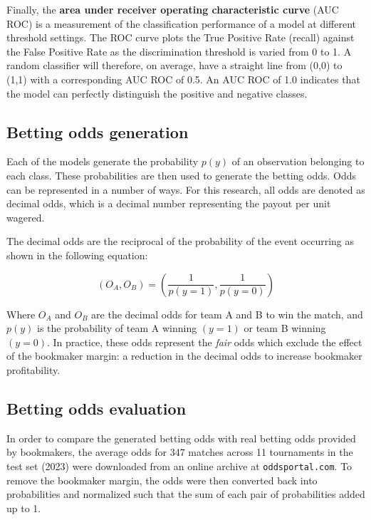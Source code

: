 Finally, the \textbf{area under receiver operating characteristic curve} (AUC ROC) is a measurement of the classification performance of a model at different threshold settings. The ROC curve plots the True Positive Rate (recall) against the False Positive Rate as the discrimination threshold is varied from 0 to 1. A random classifier will therefore, on average, have a straight line from (0,0) to (1,1) with a corresponding AUC ROC of 0.5. An AUC ROC of 1.0 indicates that the model can perfectly distinguish the positive and negative classes.

\subsection{Betting odds generation}

Each of the models generate the probability $p(y)$ of an observation belonging to each class. These probabilities are then used to generate the betting odds. Odds can be represented in a number of ways. For this research, all odds are denoted as decimal odds, which is a decimal number representing the payout per unit wagered. 

The decimal odds are the reciprocal of the probability of the event occurring as shown in the following equation:

\[ \left( O_A, O_B \right)  = \left( \frac{1}{p(y=1)}, \frac{1}{p(y=0)} \right) \]

Where $O_A$ and $O_B$ are the decimal odds for team A and B to win the match, and $p(y)$ is the probability of team A winning $(y=1)$ or team B winning $(y=0)$. In practice, these odds represent the \textit{fair} odds which exclude the effect of the bookmaker margin: a reduction in the decimal odds to increase bookmaker profitability.

\newcommand{\matchesBet}{347}
\newcommand{\tournamentsBet}{11}

\subsection{Betting odds evaluation}

In order to compare the generated betting odds with real betting odds provided by bookmakers, the average odds for \matchesBet{} matches across \tournamentsBet{} tournaments in the test set (2023) were downloaded from an online archive at \texttt{oddsportal.com}. To remove the bookmaker margin, the odds were then converted back into probabilities and normalized such that the sum of each pair of probabilities added up to 1.

